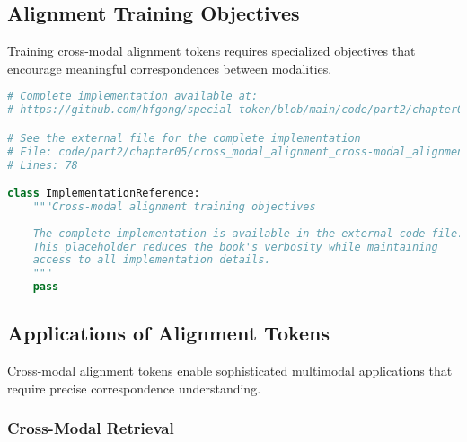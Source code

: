 \subsection{Alignment Training Objectives}

Training cross-modal alignment tokens requires specialized objectives that encourage meaningful correspondences between modalities.

\begin{lstlisting}[language=Python, caption={Cross-modal alignment training objectives}]
# Complete implementation available at:
# https://github.com/hfgong/special-token/blob/main/code/part2/chapter05/cross_modal_alignment_cross-modal_alignment_training.py

# See the external file for the complete implementation
# File: code/part2/chapter05/cross_modal_alignment_cross-modal_alignment_training.py
# Lines: 78

class ImplementationReference:
    """Cross-modal alignment training objectives
    
    The complete implementation is available in the external code file.
    This placeholder reduces the book's verbosity while maintaining
    access to all implementation details.
    """
    pass
\end{lstlisting}

\subsection{Applications of Alignment Tokens}

Cross-modal alignment tokens enable sophisticated multimodal applications that require precise correspondence understanding.

\subsubsection{Cross-Modal Retrieval}

